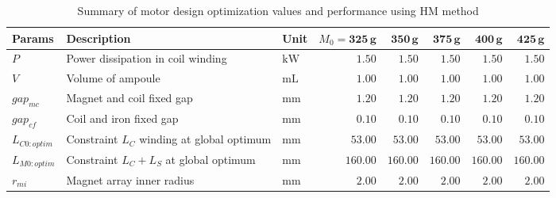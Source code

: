         
        \begin{landscape}
                \begin{table}
                    \renewcommand{\arraystretch}{1.2}
                    \caption{Summary of motor design optimization values and performance using \acs {HM} method}
                    \label{table:result for global optimization of PMLSM via HM method}
                    \centering
                    \begin{tabular}{lllrrrrr}
                        \hline
                        \textbf{Params}     & \textbf{Description}                            & \textbf{Unit}           & $M_0=\mathbf{325\,g}$ & $\mathbf{350\,g}$ & $\mathbf{375\,g}$ & $\mathbf{400\,g}$ & $\mathbf{425\,g}$ \\
                        \hline
                        $P$        & Power dissipation in coil winding      & $\mathrm{kW}$  & $1.50$                & $1.50$            & $1.50$            & $1.50$            & $1.50$            \\
                        $V$        & Volume of ampoule                      & $\mathrm{mL}$  & $1.00$                & $1.00$            & $1.00$            & $1.00$            & $1.00$            \\
                        $gap_{mc}$ & Magnet and coil fixed gap              & $\mathrm{mm}$  & $1.20$                & $1.20$            & $1.20$            & $1.20$            & $1.20$            \\
                        $gap_{cf}$ & Coil and iron fixed gap                & $\mathrm{mm}$  & $0.10$                & $0.10$            & $0.10$            & $0.10$            & $0.10$            \\
                        \hline
                        $L_{C0:optim}$ & Constraint $L_C$ winding at global optimum & $\mathrm{mm}$        & $53.00$                       & $53.00$           & $53.00$           & $53.00$           & $53.00$           \\
                        $L_{M0:optim}$ & Constraint $L_C+L_S$ at global optimum        & $\mathrm{mm}$        & $160.00$                      & $160.00$          & $160.00$          & $160.00$          & $160.00$          \\
                        \hline
                        $r_{mi}$   & Magnet array inner radius              & $\mathrm{mm}$  & $2.00$                & $2.00$            & $2.00$            & $2.00$            & $2.00$            \\

\end{tabular}
\end{table}
\end{landscape}
